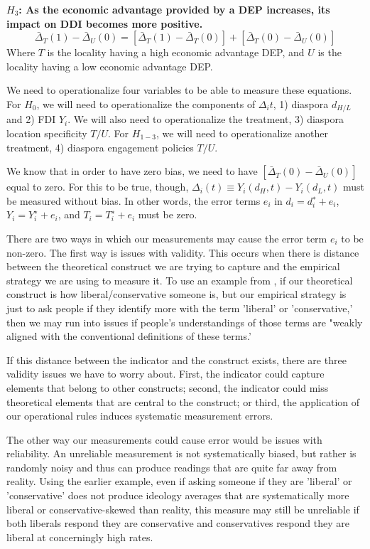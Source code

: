 \documentclass[12pt]{article}
\begin{document}
\textbf{$H_3$:  As the economic advantage provided by a DEP increases, its impact on DDI becomes more positive.}
\[
\bar{\Delta}_T(1)-\bar{\Delta}_U(0)
=
\left[\bar{\Delta}_T(1)-\bar{\Delta}_T(0)\right]
+
\left[\bar{\Delta}_T(0)-\bar{\Delta}_U(0)\right]
\]
Where $T$ is the locality having a high economic advantage DEP, and $U$ is the locality having a low economic advantage DEP.

    We need to operationalize four variables to be able to measure these equations. For $H_0$, we will need to operationalize the components of $\Delta_it$, 1) diaspora $d_{H/L}$ and 2) FDI $Y_i$. We will also need to operationalize the treatment, 3) diaspora location specificity $T/U$. For $H_{1-3}$, we will need to operationalize another treatment, 4) diaspora engagement policies $T/U$.  

     We know that in order to have zero bias, we need to have $\left[\bar{\Delta}_T(0)-\bar{\Delta}_U(0)\right]$ equal to zero. For this to be true, though, $
\Delta_i(t) \equiv Y_i(d_H,t)-Y_i(d_L,t)$ must be measured without bias. In other words, the error terms $e_i$ in $d_i=d_i^∗+e_i$, $Y_i=Y_i^∗+e_i$, and $T_i=T_i^∗+e_i$ must be zero. 

    There are two ways in which our measurements may cause the error term $e_i$ to be non-zero. The first way is issues with validity. This occurs when there is distance between the theoretical construct we are trying to capture and the empirical strategy we are using to measure it. To use an example from \citet{yeung_self-reported_2025}, if our theoretical construct is how liberal/conservative someone is, but our empirical strategy is just to ask people if they identify more with the term 'liberal' or 'conservative,' then we may run into issues if people's understandings of those terms are "weakly aligned with the conventional definitions of these terms.'
    
    If this distance between the indicator and the construct exists, there are three validity issues we have to worry about. First, the indicator could capture elements that belong to other constructs; second, the indicator could miss theoretical elements that are central to the construct; or third, the application of our operational rules induces systematic measurement errors.

    The other way our measurements could cause error would be issues with reliability. An unreliable measurement is not systematically biased, but rather is randomly noisy and thus can produce readings that are quite far away from reality. Using the earlier example, even if asking someone if they are 'liberal' or 'conservative' does not produce ideology averages that are systematically more liberal or conservative-skewed than reality, this measure may still be unreliable if both liberals respond they are conservative and conservatives respond they are liberal at concerningly high rates. 
\end{document}
